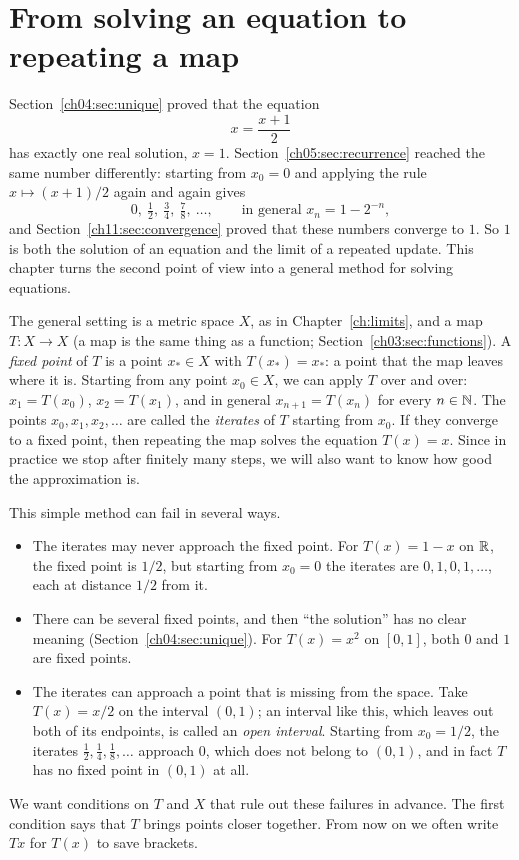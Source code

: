 \section{From solving an equation to repeating a map}\label{ch12:sec:iteration}
Section~\ref{ch04:sec:unique} proved that the equation
\[
x=\frac{x+1}{2}
\]
has exactly one real solution, $x=1$. Section~\ref{ch05:sec:recurrence} reached the same number differently: starting from $x_0=0$ and applying the rule $x\mapsto(x+1)/2$ again and again gives
\[
0,\ \tfrac12,\ \tfrac34,\ \tfrac78,\ \ldots,\qquad\text{in general }x_n=1-2^{-n},
\]
and Section~\ref{ch11:sec:convergence} proved that these numbers converge to $1$. So $1$ is both the solution of an equation and the limit of a repeated update. This chapter turns the second point of view into a general method for solving equations.

The general setting is a metric space $X$, as in Chapter~\ref{ch:limits}, and a map $T:X\to X$ (a map is the same thing as a function; Section~\ref{ch03:sec:functions}). A \emph{fixed point} of $T$ is a point $x_*\in X$ with $T(x_*)=x_*$: a point that the map leaves where it is. Starting from any point $x_0\in X$, we can apply $T$ over and over: $x_1=T(x_0)$, $x_2=T(x_1)$, and in general $x_{n+1}=T(x_n)$ for every $n\in\mathbb N$. The points $x_0,x_1,x_2,\ldots$ are called the \emph{iterates} of $T$ starting from $x_0$. If they converge to a fixed point, then repeating the map solves the equation $T(x)=x$. Since in practice we stop after finitely many steps, we will also want to know how good the approximation is.

This simple method can fail in several ways.
\begin{itemize}
\item The iterates may never approach the fixed point. For $T(x)=1-x$ on $\mathbb R$, the fixed point is $1/2$, but starting from $x_0=0$ the iterates are $0,1,0,1,\ldots$, each at distance $1/2$ from it.
\item There can be several fixed points, and then ``the solution'' has no clear meaning (Section~\ref{ch04:sec:unique}). For $T(x)=x^2$ on $[0,1]$, both $0$ and $1$ are fixed points.
\item The iterates can approach a point that is missing from the space. Take $T(x)=x/2$ on the interval $(0,1)$; an interval like this, which leaves out both of its endpoints, is called an \emph{open interval}. Starting from $x_0=1/2$, the iterates $\tfrac12,\tfrac14,\tfrac18,\ldots$ approach $0$, which does not belong to $(0,1)$, and in fact $T$ has no fixed point in $(0,1)$ at all.
\end{itemize}
We want conditions on $T$ and $X$ that rule out these failures in advance. The first condition says that $T$ brings points closer together. From now on we often write $Tx$ for $T(x)$ to save brackets.

